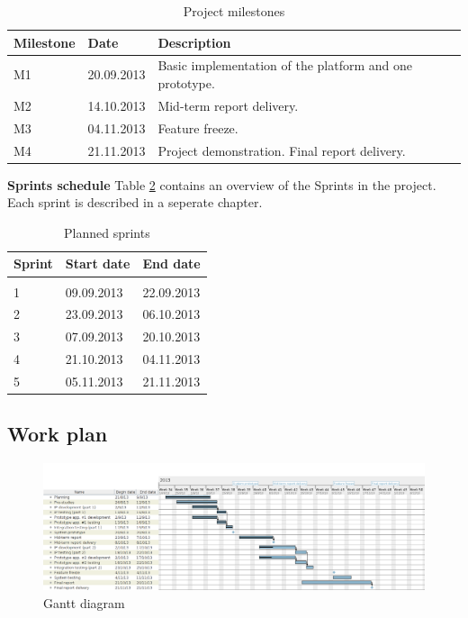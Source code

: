 \begin{table}[h]
\begin{center}
\begin{tabular}{ | l | l | l | }
  \hline
  Milestone & Date & Description \\
  \hline\noalign{\smallskip}\noalign{\smallskip}\hline
  M1 & 20.09.2013 & Basic implementation of the platform and one prototype. \\ 
  M2 & 14.10.2013 & Mid-term report delivery. \\
  M3 & 04.11.2013 & Feature freeze. \\
  M4 & 21.11.2013 & Project demonstration. Final report delivery. \\
  \hline
\end{tabular}
\end{center}
\caption{Project milestones}
\label{table:milestones}
\end{table}

\textbf{Sprints schedule} \newline
Table \ref{table:sprints} contains an overview of the Sprints in the project.
Each sprint is described in a seperate chapter.

\begin{table}[h]
\begin{center}
\begin{tabular}{ | l | l | l | }
  \hline
  Sprint & Start date & End date \\
  \hline\noalign{\smallskip}\noalign{\smallskip}\hline
  0 &  &  \\ 
  1 & 09.09.2013 & 22.09.2013 \\
  2 & 23.09.2013 & 06.10.2013 \\
  3 & 07.09.2013 & 20.10.2013 \\
  4 & 21.10.2013 & 04.11.2013 \\
  5 & 05.11.2013 & 21.11.2013 \\
  \hline
\end{tabular}
\end{center}
\caption{Planned sprints}
\label{table:sprints}
\end{table}


\subsection{Work plan}

\newpage
\begin{landscape}
\begin{figure}[h]
\includegraphics[scale=0.66]{../Figures/gantt-diagram.png}
\caption{Gantt diagram}
\label{figure:work-splan}
\end{figure}
\end{landscape}

